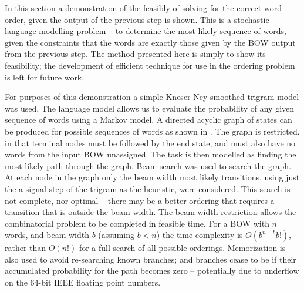\documentclass[11pt]{article}
\theoremstyle{plain}
\theoremstyle{definition}
\begin{document}

In this section a demonstration of the feasibly of solving for the correct word order, given the output of the previous step is shown. This is a stochastic language modelling problem -- to determine the most likely sequence of words, given the constraints that the words are exactly those given by the BOW output from the previous step. The method presented here is simply to show its feasibility; the development of efficient technique for use in the ordering problem is left for future work.

For purposes of this demonstration a simple Kneser-Ney smoothed trigram model \parencite{kneser1995improved} was used. The language model allows us to evaluate the probability of any given sequence of words using a Markov model.
A directed acyclic graph of states can be produced for possible sequences of words as shown in . The graph is restricted, in that terminal nodes must be followed by the end state, and must also have no words from the input BOW unassigned. The task is then modelled as finding the most-likely path through the graph.
Beam search was used to search the graph. At each node in the graph only the beam width most likely transitions, using just the a signal step of the trigram as the heuristic, were considered. This search is not complete, nor optimal -- there may be a better ordering that requires a transition that is outside the beam width. The beam-width restriction allows the combinatorial problem to be completed in feasible time. For a BOW with $n$ words, and beam width $b$ (assuming $b<n$) the time complexity is $O(b^{n-b}b!)$, rather than $O(n!)$ for a full search of all possible orderings. Memorization is also used to avoid re-searching known branches; and branches cease to be  if their accumulated probability for the path becomes zero -- potentially due to underflow on the 64-bit IEEE floating point numbers.
\end{document}
